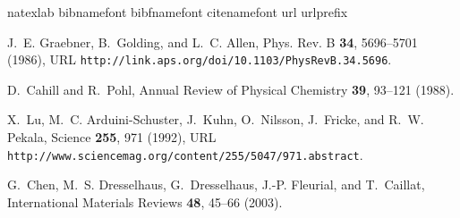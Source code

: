 \documentclass[aps,prb,onecolumn,preprint,footinbib,superscriptaddress,amsmath,amssymb,floatfix]{revtex4}
\begin{document}
\begin{thebibliography}{90}
\expandafter\ifx\csname natexlab\endcsname\relax\def\natexlab#1{#1}\fi
\expandafter\ifx\csname bibnamefont\endcsname\relax
  \def\bibnamefont#1{#1}\fi
\expandafter\ifx\csname bibfnamefont\endcsname\relax
  \def\bibfnamefont#1{#1}\fi
\expandafter\ifx\csname citenamefont\endcsname\relax
  \def\citenamefont#1{#1}\fi
\expandafter\ifx\csname url\endcsname\relax
  \def\url#1{\texttt{#1}}\fi
\expandafter\ifx\csname urlprefix\endcsname\relax\def\urlprefix{URL }\fi
\providecommand{\bibinfo}[2]{#2}
\providecommand{\eprint}[2][]{\url{#2}}

\bibinfo{author}{\bibfnamefont{J.~E.} \bibnamefont{Graebner}},
  \bibinfo{author}{\bibfnamefont{B.}~\bibnamefont{Golding}}, \bibnamefont{and}
  \bibinfo{author}{\bibfnamefont{L.~C.} \bibnamefont{Allen}},
  \bibinfo{journal}{Phys. Rev. B} \textbf{\bibinfo{volume}{34}},
  \bibinfo{pages}{5696–5701} (\bibinfo{year}{1986}),
  \urlprefix\url{http://link.aps.org/doi/10.1103/PhysRevB.34.5696}.

\bibinfo{author}{\bibfnamefont{D.}~\bibnamefont{Cahill}} \bibnamefont{and}
  \bibinfo{author}{\bibfnamefont{R.}~\bibnamefont{Pohl}},
  \bibinfo{journal}{Annual Review of Physical Chemistry}
  \textbf{\bibinfo{volume}{39}}, \bibinfo{pages}{93–121}
  (\bibinfo{year}{1988}).

\bibinfo{author}{\bibfnamefont{X.}~\bibnamefont{Lu}},
  \bibinfo{author}{\bibfnamefont{M.~C.} \bibnamefont{Arduini-Schuster}},
  \bibinfo{author}{\bibfnamefont{J.}~\bibnamefont{Kuhn}},
  \bibinfo{author}{\bibfnamefont{O.}~\bibnamefont{Nilsson}},
  \bibinfo{author}{\bibfnamefont{J.}~\bibnamefont{Fricke}}, \bibnamefont{and}
  \bibinfo{author}{\bibfnamefont{R.~W.} \bibnamefont{Pekala}},
  \bibinfo{journal}{Science} \textbf{\bibinfo{volume}{255}},
  \bibinfo{pages}{971} (\bibinfo{year}{1992}),
  \urlprefix\url{http://www.sciencemag.org/content/255/5047/971.abstract}.

\bibinfo{author}{\bibfnamefont{G.}~\bibnamefont{Chen}},
  \bibinfo{author}{\bibfnamefont{M.~S.} \bibnamefont{Dresselhaus}},
  \bibinfo{author}{\bibfnamefont{G.}~\bibnamefont{Dresselhaus}},
  \bibinfo{author}{\bibfnamefont{J.-P.} \bibnamefont{Fleurial}},
  \bibnamefont{and} \bibinfo{author}{\bibfnamefont{T.}~\bibnamefont{Caillat}},
  \bibinfo{journal}{International Materials Reviews}
  \textbf{\bibinfo{volume}{48}}, \bibinfo{pages}{45–66}
  (\bibinfo{year}{2003}).


\end{thebibliography}
\end{document}
